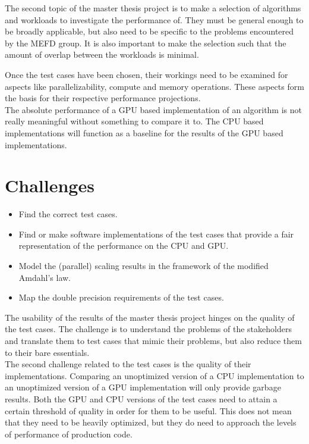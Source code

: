 The second topic of the master thesis project is to make a selection of algorithms and workloads to investigate the performance of. They must be general enough to be broadly applicable, but also need to be specific to the problems encountered by the MEFD group. It is also important to make the selection such that the amount of overlap between the workloads is minimal.

\newpage

Once the test cases have been chosen, their workings need to be examined for aspects like parallelizability, compute and memory operations. These aspects form the basis for their respective performance projections.\\

The absolute performance of a GPU based implementation of an algorithm is not really meaningful without something to compare it to. The CPU based implementations will function as a baseline for the results of the GPU based implementations.

\section{Challenges}

\begin{itemize}
    \item Find the correct test cases.
    \item Find or make software implementations of the test cases that provide a fair representation of the performance on the CPU and GPU.
    \item Model the (parallel) scaling results in the framework of the modified Amdahl's law.
    \item Map the double precision requirements of the test cases.
\end{itemize}

\hspace{3mm}

The usability of the results of the master thesis project hinges on the quality of the test cases. The challenge is to understand the problems of the stakeholders and translate them to test cases that mimic their problems, but also reduce them to their bare essentials.\\

The second challenge related to the test cases is the quality of their implementations. Comparing an unoptimized version of a CPU implementation to an unoptimized version of a GPU implementation will only provide garbage results. Both the GPU and CPU versions of the test cases need to attain a certain threshold of quality in order for them to be useful. This does not mean that they need to be heavily optimized, but they do need to approach the levels of performance of production code.\\

